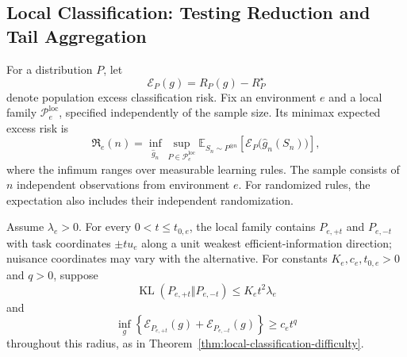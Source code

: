 \subsection{Local Classification: Testing Reduction and Tail Aggregation}
\label{app:theory-classification}

For a distribution \(P\), let
\[
\mathcal E_P(g)=R_P(g)-R_P^\star
\]
denote population excess classification risk. Fix an environment \(e\) and a local family \(\mathcal P_e^{\mathrm{loc}}\), specified independently of the sample size. Its minimax expected excess risk is
\[
\mathfrak R_e(n)
=
\inf_{\widehat g_n}
\sup_{P\in\mathcal P_e^{\mathrm{loc}}}
\mathbb E_{S_n\sim P^{\otimes n}}
\!\left[
\mathcal E_P\bigl(\widehat g_n(S_n)\bigr)
\right],
\tag{A.15}\label{eq:app-local-minimax}
\]
where the infimum ranges over measurable learning rules. The sample consists of \(n\) independent observations from environment \(e\). For randomized rules, the expectation also includes their independent randomization.

Assume \(\lambda_e>0\). For every \(0<t\le t_{0,e}\), the local family contains \(P_{e,+t}\) and \(P_{e,-t}\) with task coordinates \(\pm tu_e\) along a unit weakest efficient-information direction; nuisance coordinates may vary with the alternative. For constants \(K_e,c_e,t_{0,e}>0\) and \(q>0\), suppose
\[
\operatorname{KL}(P_{e,+t}\Vert P_{e,-t})
\le K_et^2\lambda_e
\]
and
\[
\inf_g
\left\{
\mathcal E_{P_{e,+t}}(g)
+
\mathcal E_{P_{e,-t}}(g)
\right\}
\ge c_et^q
\]
throughout this radius, as in Theorem~\ref{thm:local-classification-difficulty}.

